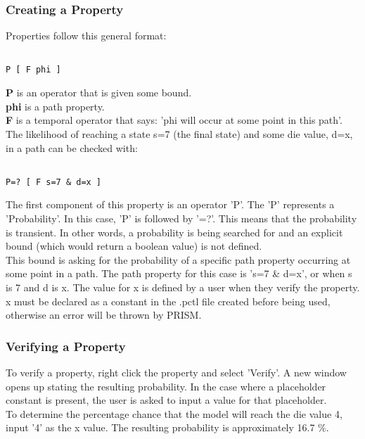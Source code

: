 \documentclass[a4paper]{article}
\begin{document}
\subsubsection{Creating a Property}

Properties follow this general format:

\begin{lstlisting}

P [ F phi ]

\end{lstlisting}
\textbf{P} is an operator that is given some bound.
\\[1\baselineskip]
\textbf{phi} is a path property.
\\[1\baselineskip]
\textbf{F} is a temporal operator that says: 'phi will occur at some point in this path'.
\\[1\baselineskip]
The likelihood of reaching a state s=7 (the final state) and some die value, d=x, in a path can be checked with:


\begin{lstlisting}

P=? [ F s=7 & d=x ]

\end{lstlisting}

The first component of this property is an operator 'P'. The 'P' represents a 'Probability'. In this case, 'P' is followed by '=?'. 
This means that the probability is transient. In other words, a probability is being searched for and an explicit bound (which would return a boolean value) is not defined.
\\[1\baselineskip]
This bound is asking for the probability of a specific path property occurring at some point in a path. The path property for this case is 's=7 \& d=x', or when s is 7 and d is x. The value for x is defined by a user when they verify the property. x must be declared as a constant in the .pctl file created before being used, otherwise an error will be thrown by PRISM. 

\subsubsection{Verifying a Property}
To verify a property, right click the property and select 'Verify'.
A new window opens up stating the resulting probability. 
In the case where a placeholder constant is present, the user is asked to input a value for that placeholder.
\\[1\baselineskip]
To determine the percentage chance that the model will reach the die value 4, input '4' as the x value. The resulting probability is approximately 16.7 \%. 
\end{document}
